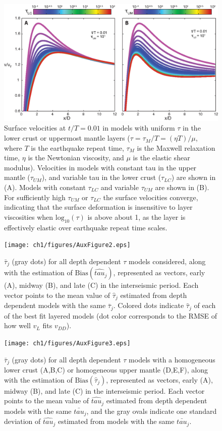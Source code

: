 \begin{figure}
\includegraphics{ch1/figures/AuxFigure1.eps}
\caption{Surface velocities at $t/T = 0.01$ in models with uniform
$\tau$ in the lower crust or uppermost mantle layers ($\tau = \tau_M/T
= (\eta T)/\mu$, where $T$ is the earthquake repeat time, $\tau_M$ is
the Maxwell relaxation time, $\eta$ is the Newtonian viscosity, and
$\mu$ is the elastic shear modulus).  Velocities in models with
constant tau in the upper mantle ($\tau_{UM}$), and variable tau in
the lower crust ($\tau_{LC}$) are shown in (A).  Models with constant
$\tau_{LC}$ and variable $\tau_{UM}$ are shown in (B).  For
sufficiently high $\tau_{UM}$ or $\tau_{LC}$ the surface velocities
converge, indicating that the surface deformation is insensitive to
layer viscosities when $\mathrm{log}_{10}(\tau)$ is above about 1, as
the layer is effectively elastic over earthquake repeat time scales.}
\label{ch1:fig:A1}
\end{figure}

\begin{figure}
\texttt{[image: ch1/figures/AuxFigure2.eps]}
\caption{$\bar{\tau}_j$ (gray dots) for all depth dependent $\tau$
models considered, along with the estimation of $\mathrm{Bias}(\hat{tau}_j)$,
represented as vectors, early (A), midway (B), and late (C) in the
interseismic period.  Each vector points to the mean value of
$\hat{\tau}_j$ estimated from depth dependent models with the same
$\bar{\tau}_j$.  Colored dots indicate $\hat{\tau}_j$ of each of the best fit
layered models (dot color corresponds to the RMSE of how well $v_L$ fits
$v_{DD}$).}
\label{ch1:fig:A2}
\end{figure}

\begin{figure}
\texttt{[image: ch1/figures/AuxFigure3.eps]}
\caption{$\bar{\tau}_j$ (gray dots) for all depth dependent $\tau$
models with a homogeneous lower crust (A,B,C) or homogeneous upper
mantle (D,E,F), along with the estimation of $\mathrm{Bias}(\hat{\tau}_j)$,
represented as vectors, early (A), midway (B), and late (C) in the
interseismic period.  Each vector points to the mean value of
$\hat{tau}_j$ estimated from depth dependent models with the same
$\bar{tau}_j$, and the gray ovals indicate one standard deviation of
$\hat{tau}_j$ estimated from models with the same $\bar{tau}_j$.}
\label{ch1:fig:A3}
\end{figure}

